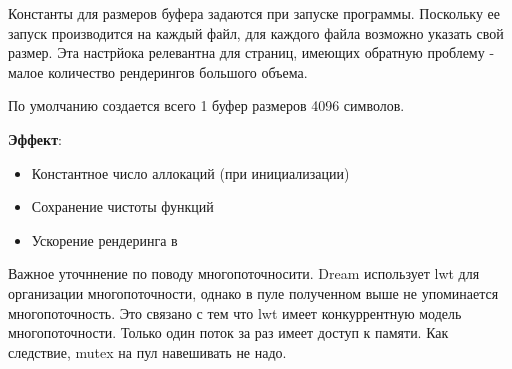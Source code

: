 Константы для размеров буфера задаются при запуске программы. Поскольку ее запуск производится на каждый файл, для каждого файла возможно указать свой размер.
Эта настрйока релевантна для страниц, имеющих обратную проблему - малое количество рендерингов большого объема. %

По умолчанию создается всего 1 буфер размеров 4096 символов.


\textbf{Эффект}:
\begin{itemize}
    \item Константное число аллокаций (при инициализации)
    \item Сохранение чистоты функций
    \item Ускорение рендеринга в 
\end{itemize}

Важное уточннение по поводу многопоточносити. Dream использует lwt для организации многопоточности, однако в пуле полученном выше не упоминается многопоточность. Это связано с тем что lwt имеет конкуррентную модель многопоточности. Только один поток за раз имеет доступ к памяти. Как следствие, mutex на пул навешивать не надо.




